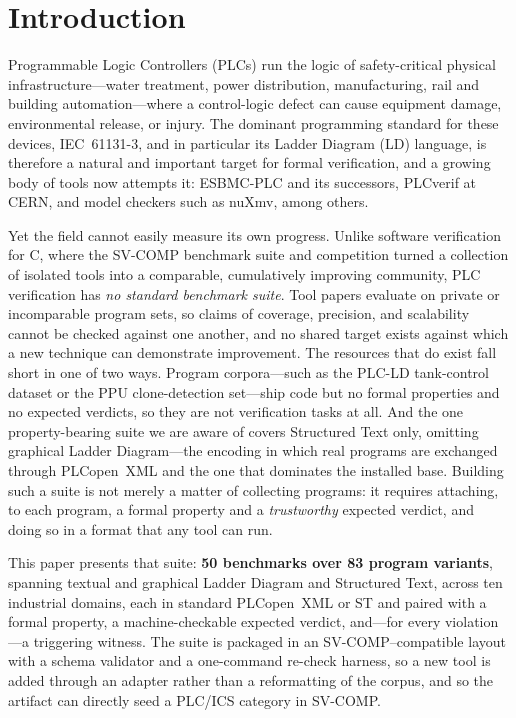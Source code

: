 \section{Introduction}
\label{sec:intro}

Programmable Logic Controllers (PLCs) run the logic of safety-critical physical
infrastructure---water treatment, power distribution, manufacturing, rail and building
automation---where a control-logic defect can cause equipment damage, environmental
release, or injury. The dominant programming standard for these devices, IEC~61131-3,
and in particular its Ladder Diagram (LD) language, is therefore a natural and important
target for formal verification, and a growing body of tools now attempts it: ESBMC-PLC and
its successors, PLCverif at CERN, and model checkers such as nuXmv, among others.

Yet the field cannot easily measure its own progress. Unlike software verification for C,
where the SV-COMP benchmark suite and competition turned a collection of isolated tools into
a comparable, cumulatively improving community, PLC verification has \emph{no standard
benchmark suite}. Tool papers evaluate on private or incomparable program sets, so claims of
coverage, precision, and scalability cannot be checked against one another, and no shared
target exists against which a new technique can demonstrate improvement. The resources that
do exist fall short in one of two ways. Program corpora---such as the PLC-LD tank-control
dataset or the PPU clone-detection set---ship code but no formal properties and no expected
verdicts, so they are not verification tasks at all. And the one property-bearing suite we
are aware of covers Structured Text only, omitting graphical Ladder Diagram---the encoding
in which real programs are exchanged through PLCopen~XML and the one that dominates the
installed base. Building such a suite is not merely a matter of collecting programs: it
requires attaching, to each program, a formal property and a \emph{trustworthy} expected
verdict, and doing so in a format that any tool can run.

This paper presents that suite: \textbf{50 benchmarks over 83 program variants}, spanning
textual and graphical Ladder Diagram and Structured Text, across ten industrial domains,
each in standard PLCopen~XML or ST and paired with a formal property, a machine-checkable
expected verdict, and---for every violation---a triggering witness. The suite is packaged in
an SV-COMP--compatible layout with a schema validator and a one-command re-check harness, so
a new tool is added through an adapter rather than a reformatting of the corpus, and so the
artifact can directly seed a PLC/ICS category in SV-COMP.

